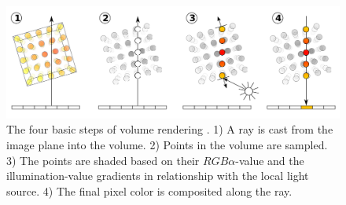 \begin{figure}[h]
    \centering
    \includegraphics[width=1.0\textwidth]{figures/VolumeRenderingRayCasting.png}
    \caption{The four basic steps of volume rendering \cite{wiki:Volume_ray_casting}. 1) A ray is cast from the image plane into the volume. 2) Points in the volume are sampled. 3) The points are shaded based on their $RGB\alpha$-value and the illumination-value gradients in relationship with the local light source. 4) The final pixel color is composited along the ray.}
    \label{fig:volume-rendering}
\end{figure}